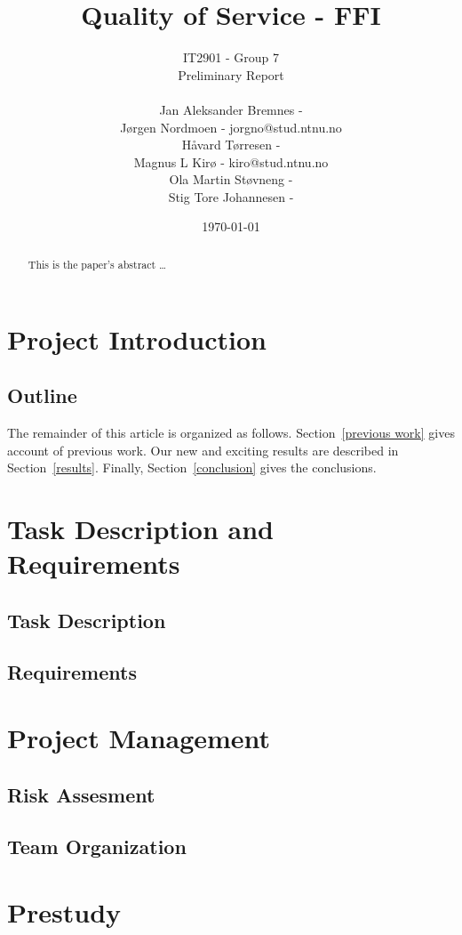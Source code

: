 \documentclass[12pt]{article}
\title{Quality of Service - FFI}
\author{
        IT2901 - Group 7  \\ 
        Preliminary Report 
        \\ \\
        Jan Aleksander Bremnes - \\
        Jørgen Nordmoen - jorgno@stud.ntnu.no\\
        Håvard Tørresen - \\
        Magnus L Kirø - kiro@stud.ntnu.no\\
        Ola Martin Støvneng - \\
        Stig Tore Johannesen - \\
}
\date{\today}
\begin{document}
\maketitle
\titlepage
{}

\begin{abstract}\label{abstract}
This is the paper's abstract \ldots
\end{abstract}

\newpage
\tableofcontents
\newpage

\section{Project Introduction}\label{intoduction}
\subsection{Outline}\label{outline} 
The remainder of this article is organized as follows. Section~\ref{previous work} gives account of previous work. Our new and exciting results are described in Section~\ref{results}. Finally, Section~\ref{conclusion} gives the conclusions.

\section{Task Description and Requirements}\label{tanskreq}
\subsection{Task Description}\label{task}
\subsection{Requirements}\label{requirements}
\section{Project Management}\label{management}
\subsection{Risk Assesment}\label{risk}
\subsection{Team Organization}\label{team}
\section{Prestudy}\label{prestudy}
\end{document}
